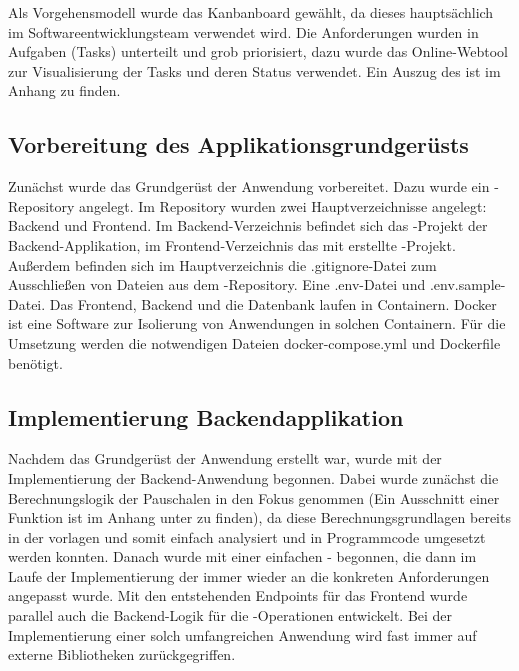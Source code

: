 Als Vorgehensmodell wurde das Kanbanboard gewählt, da dieses hauptsächlich im Softwareentwicklungsteam verwendet wird. Die Anforderungen wurden in Aufgaben (Tasks) unterteilt und grob priorisiert, dazu wurde das Online-Webtool  zur Visualisierung der Tasks und deren Status verwendet.
Ein Auszug des  ist im Anhang zu finden.

\subsection{Vorbereitung des Applikationsgrundgerüsts}

Zunächst wurde das Grundgerüst der Anwendung vorbereitet. Dazu wurde ein -Repository angelegt. Im Repository wurden zwei Hauptverzeichnisse angelegt: Backend und Frontend. Im Backend-Verzeichnis befindet sich das -Projekt der Backend-Applikation, im Frontend-Verzeichnis das mit  erstellte  -Projekt. Außerdem befinden sich im Hauptverzeichnis die .gitignore-Datei zum Ausschließen von Dateien aus dem -Repository. Eine .env-Datei und .env.sample-Datei. Das Frontend, Backend und die Datenbank laufen in Containern. Docker ist eine Software zur Isolierung von Anwendungen in solchen Containern. Für die Umsetzung werden die notwendigen Dateien docker-compose.yml und Dockerfile benötigt.

\subsection{Implementierung Backendapplikation}

Nachdem das Grundgerüst der Anwendung erstellt war, wurde mit der Implementierung der Backend-Anwendung begonnen. Dabei wurde zunächst die Berechnungslogik der Pauschalen in den Fokus genommen (Ein Ausschnitt einer Funktion ist im Anhang unter  zu finden), da diese Berechnungsgrundlagen bereits in der  vorlagen und somit einfach analysiert und in Programmcode umgesetzt werden konnten. Danach wurde mit einer einfachen - begonnen, die dann im Laufe der Implementierung der  immer wieder an die konkreten Anforderungen angepasst wurde. Mit den entstehenden Endpoints für das Frontend wurde parallel auch die Backend-Logik für die -Operationen entwickelt. Bei der Implementierung einer solch umfangreichen Anwendung wird fast immer auf externe Bibliotheken zurückgegriffen.

